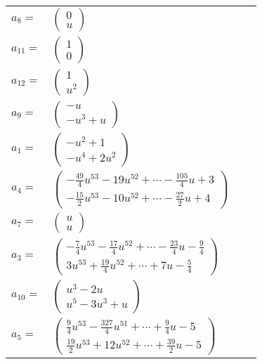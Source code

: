 \documentclass[1p]{elsarticle_modified}
\theoremstyle{definition}
\begin{document}
\begin{tabular}{m{7pt} m{180pt} m{7pt} m{180pt} }
\flushright $a_{8}=$&$\begin{pmatrix}0\\u\end{pmatrix}$ \\
\flushright $a_{11}=$&$\begin{pmatrix}1\\0\end{pmatrix}$ \\
\flushright $a_{12}=$&$\begin{pmatrix}1\\u^2\end{pmatrix}$ \\
\flushright $a_{9}=$&$\begin{pmatrix}- u\\- u^3+u\end{pmatrix}$ \\
\flushright $a_{1}=$&$\begin{pmatrix}- u^2+1\\- u^4+2 u^2\end{pmatrix}$ \\
\flushright $a_{4}=$&$\begin{pmatrix}-\frac{49}{4} u^{53}-19 u^{52}+\cdots-\frac{105}{4} u+3\\-\frac{15}{2} u^{53}-10 u^{52}+\cdots-\frac{27}{2} u+4\end{pmatrix}$ \\
\flushright $a_{7}=$&$\begin{pmatrix}u\\u\end{pmatrix}$ \\
\flushright $a_{3}=$&$\begin{pmatrix}-\frac{7}{4} u^{53}-\frac{17}{4} u^{52}+\cdots-\frac{23}{4} u-\frac{9}{4}\\3 u^{53}+\frac{19}{4} u^{52}+\cdots+7 u-\frac{5}{4}\end{pmatrix}$ \\
\flushright $a_{10}=$&$\begin{pmatrix}u^3-2 u\\u^5-3 u^3+u\end{pmatrix}$ \\
\flushright $a_{5}=$&$\begin{pmatrix}\frac{9}{4} u^{53}-\frac{327}{4} u^{51}+\cdots+\frac{9}{4} u-5\\\frac{19}{2} u^{53}+12 u^{52}+\cdots+\frac{39}{2} u-5\end{pmatrix}$ \\

\end{tabular}
\end{document}
